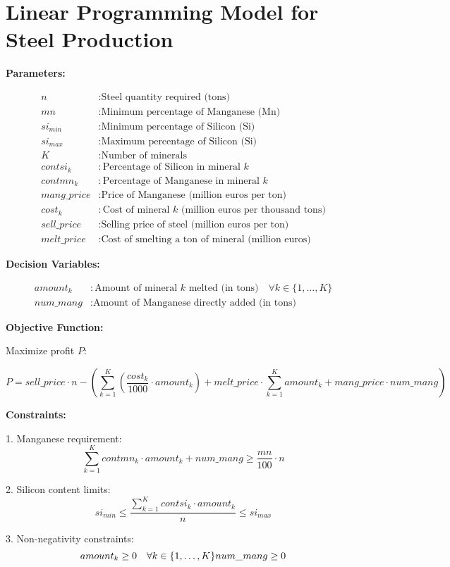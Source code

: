 \documentclass{article}
\begin{document}
\section*{Linear Programming Model for Steel Production}

\textbf{Parameters:}

\begin{align*}
n & : \text{Steel quantity required (tons)} \\
mn & : \text{Minimum percentage of Manganese (Mn)} \\
si_{min} & : \text{Minimum percentage of Silicon (Si)} \\
si_{max} & : \text{Maximum percentage of Silicon (Si)} \\
K & : \text{Number of minerals} \\
contsi_{k} & : \text{Percentage of Silicon in mineral } k \\
contmn_{k} & : \text{Percentage of Manganese in mineral } k \\
mang\_price & : \text{Price of Manganese (million euros per ton)} \\
cost_{k} & : \text{Cost of mineral } k \text{ (million euros per thousand tons)} \\
sell\_price & : \text{Selling price of steel (million euros per ton)} \\
melt\_price & : \text{Cost of smelting a ton of mineral (million euros)}
\end{align*}

\textbf{Decision Variables:}

\begin{align*}
amount_{k} & : \text{Amount of mineral } k \text{ melted (in tons)} \quad \forall k \in \{1, \ldots, K\} \\
num\_mang & : \text{Amount of Manganese directly added (in tons)}
\end{align*}

\textbf{Objective Function:}

Maximize profit \( P \):

\[
P = sell\_price \cdot n - \left( \sum_{k=1}^{K} \left(\frac{cost_{k}}{1000} \cdot amount_{k}\right) + melt\_price \cdot \sum_{k=1}^{K} amount_{k} + mang\_price \cdot num\_mang \right)
\]

\textbf{Constraints:}

1. Manganese requirement:
\[
\sum_{k=1}^{K} contmn_{k} \cdot amount_{k} + num\_mang \geq \frac{mn}{100} \cdot n
\]

2. Silicon content limits:
\[
si_{min} \leq \frac{\sum_{k=1}^{K} contsi_{k} \cdot amount_{k}}{n} \leq si_{max}
\]

3. Non-negativity constraints:
\[
amount_{k} \geq 0 \quad \forall k \in \{1, \ldots, K\} \\
num\_mang \geq 0
\]
\end{document}
